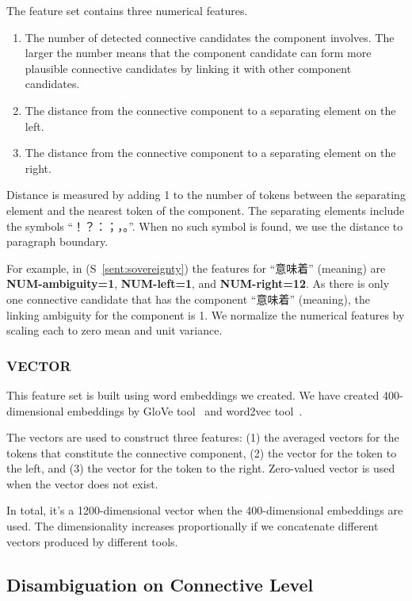 The feature set contains three numerical features.

\begin{enumerate}
    \item The number of detected connective candidates the component involves. The larger
        the number means that the component candidate can form more plausible connective
        candidates by linking it with other component candidates.
    \item The distance from the connective component to a separating element on the left.
    \item The distance from the connective component to a
        separating element on the right.
\end{enumerate}

Distance is measured by adding 1 to the number of tokens
between the separating element and the nearest token of the component.
The separating elements include the symbols ``！？：；，。''.
When no such symbol is found, we use the distance to paragraph boundary.

For example, in (S~\ref{sent:sovereignty}) the features for “意味着” (meaning) are \textbf{NUM-ambiguity=1},
\textbf{NUM-left=1}, and \textbf{NUM-right=12}. As there is only one connective candidate that has the
component “意味着” (meaning), the linking ambiguity for the component is 1.
We normalize the numerical features by scaling each to zero mean and unit variance.


\subsubsection{VECTOR}

This feature set is built using word embeddings we created.
We have created 400-dimensional embeddings by GloVe tool~\citep{pennington2014glove}
and word2vec tool~\citep{mikolov2013efficient,mikolov2013distributed}.

The vectors are used to construct three features: (1) the averaged vectors
for the tokens that constitute the connective component, (2) the vector for the
token to the left, and (3) the vector for the token to the right. Zero-valued vector is used
when the vector does not exist.

In total, it's a 1200-dimensional vector when the 400-dimensional embeddings are used.
The dimensionality increases proportionally if we concatenate different vectors produced by
different tools.

\subsection{Disambiguation on Connective Level}
\label{s:discourse-disambig-connective}


